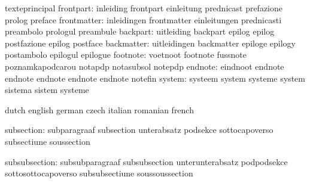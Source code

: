                            texteprincipal
                frontpart: inleiding                 frontpart
                           einleitung                prednicast
                           prefazione                prolog
                           preface
              frontmatter: inleidingen               frontmatter
                           einleitungen              prednicasti
                           preambolo                 prologul
                           preambule
                 backpart: uitleiding                backpart
                           epilog                    epilog
                           postfazione               epilog
                           postface
               backmatter: uitleidingen              backmatter
                           epiloge                   epilogy
                           postambolo                epilogul
                           epilogue
                 footnote: voetnoot                  footnote
                           fussnote                  poznamkapodcarou
                           notapdp                   notasubsol
                           notepdp
                  endnote: eindnoot                  endnote
                           endnote                   endnote
                           endnote                   endnote
                           notefin
                   system: systeem                   system
                           systeme                   system
                           sistema                   sistem
                           systeme

\stopvariables


\startvariables         dutch                                    english
                        german                                   czech
                        italian                                  romanian
                        french

            subsection: subparagraaf                             subsection
                        unterabsatz                              podsekce
                        sottocapoverso                           subsectiune
                        soussection

         subsubsection: subsubparagraaf                          subsubsection
                        unterunterabsatz                         podpodsekce
                        sottosottocapoverso                      subsubsectiune
                        soussoussection

